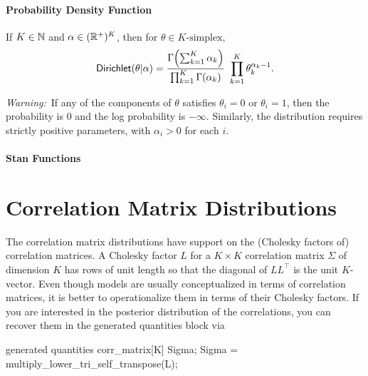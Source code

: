 \subsubsection{Probability Density Function}

If $K \in \nats$ and $\alpha \in (\posreals)^{K}$, then for
$\theta \in \mbox{$K$-simplex}$,
\[
\distro{Dirichlet}(\theta|\alpha)
=
\frac{\Gamma \! \left( \sum_{k=1}^K \alpha_k \right)}
     {\prod_{k=1}^K \Gamma(\alpha_k)}
\
\prod_{k=1}^K \theta_k^{\alpha_k - 1}
.
\]

{\it Warning:}\ If any of the components of $\theta$ satisfies
$\theta_i = 0$ or $\theta_i = 1$, then the probability is 0 and the log
probability is $-\infty$.  Similarly, the distribution requires
strictly positive parameters, with $\alpha_i > 0$ for each $i$.



\subsubsection{Stan Functions}

\begin{description}
\end{description}
%
\begin{description}
\end{description}


\chapter{Correlation Matrix Distributions}

\noindent
The correlation matrix distributions have support on the (Cholesky
factors of) correlation matrices.  A Cholesky factor $L$ for a $K
\times K$ correlation matrix $\Sigma$ of dimension $K$ has rows of unit
length so that the diagonal of $L L^{\top}$ is the unit $K$-vector. Even
though models are usually conceptualized in terms of correlation matrices,
it is better to operationalize them in terms of their Cholesky factors.
If you are interested in the posterior distribution of the correlations,
you can recover them in the generated quantities block via
%
\begin{stancode}
generated quantities {
  corr_matrix[K] Sigma;
  Sigma = multiply_lower_tri_self_transpose(L);
}
\end{stancode}
%
